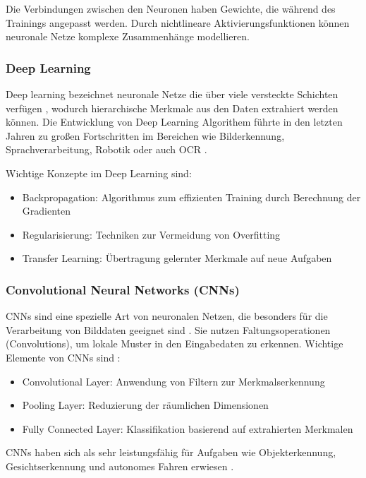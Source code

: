 Die Verbindungen zwischen den Neuronen haben Gewichte, die während des Trainings angepasst werden. Durch nichtlineare Aktivierungsfunktionen können neuronale Netze komplexe Zusammenhänge modellieren.

\subsubsection{Deep Learning}
\label{subsec:deep-learning}
Deep learning bezeichnet neuronale Netze die über viele versteckte Schichten verfügen \cite{RebalaGopinath2019AItM}, wodurch hierarchische Merkmale aus den Daten extrahiert werden können. Die Entwicklung von Deep Learning Algorithem führte in den letzten Jahren zu großen Fortschritten im Bereichen wie Bilderkennung, Sprachverarbeitung, Robotik oder auch \gls{OCR} \cite{jordan2015machine}.

Wichtige Konzepte im Deep Learning sind:
\begin{itemize}
	\item Backpropagation: Algorithmus zum effizienten Training durch Berechnung der Gradienten \cite{RebalaGopinath2019AItM}
	\item Regularisierung: Techniken zur Vermeidung von Overfitting \cite{jordan2015machine}
	\item Transfer Learning: Übertragung gelernter Merkmale auf neue Aufgaben \cite{jordan2015machine}
\end{itemize}


\subsubsection{Convolutional Neural Networks (CNNs)}
\label{subsubsec:cnn}
CNNs sind eine spezielle Art von neuronalen Netzen, die besonders für die Verarbeitung von Bilddaten geeignet sind \cite{RebalaGopinath2019AItM}. Sie nutzen Faltungsoperationen (Convolutions), um lokale Muster in den Eingabedaten zu erkennen. Wichtige Elemente von CNNs sind \cite{RebalaGopinath2019AItM}:

\begin{itemize}
	\item Convolutional Layer: Anwendung von Filtern zur Merkmalserkennung
	\item Pooling Layer: Reduzierung der räumlichen Dimensionen
	\item Fully Connected Layer: Klassifikation basierend auf extrahierten Merkmalen
\end{itemize}

CNNs haben sich als sehr leistungsfähig für Aufgaben wie Objekterkennung, Gesichtserkennung und autonomes Fahren erwiesen \cite{RebalaGopinath2019AItM}.

